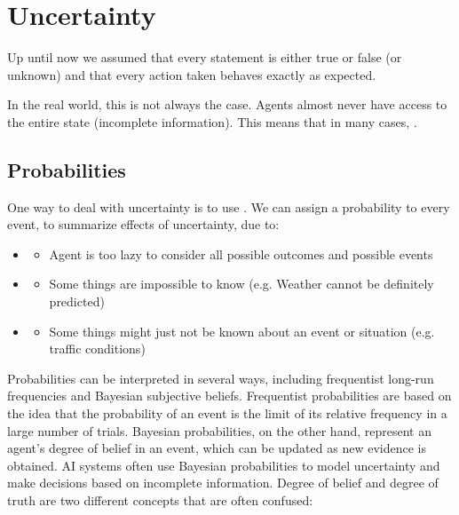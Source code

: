\documentclass[
../EiKI_Summary.tex,
]
{subfiles}
\begin{document}
\section{Uncertainty}
Up until now we assumed that every statement is either true or false (or unknown) and that every action taken behaves exactly as expected.

In the real world, this is not always the case. Agents almost never have access to the entire state (incomplete information). This means that in many cases, .

\subsection{Probabilities}
One way to deal with uncertainty is to use . We can assign a probability to every event, to summarize effects of uncertainty, due to:
\begin{itemize}
    \item {}
    \begin{itemize}
        \item Agent is too lazy to consider all possible outcomes and possible events
    \end{itemize}
    \item {}
    \begin{itemize}
        \item Some things are impossible to know (e.g. Weather cannot be definitely predicted)
    \end{itemize}
    \item {}
    \begin{itemize}
        \item Some things might just not be known about an event or situation (e.g. traffic conditions)
    \end{itemize}
\end{itemize}

Probabilities can be interpreted in several ways, including frequentist long-run frequencies and Bayesian subjective beliefs. 
Frequentist probabilities are based on the idea that the probability of an event is the limit of its relative frequency in a large number of trials. Bayesian probabilities, on the other hand, represent an agent's degree of belief in an event, which can be updated as new evidence is obtained. AI systems often use Bayesian probabilities to model uncertainty and make decisions based on incomplete information. Degree of belief and degree of truth are two different concepts that are often confused:
\end{document}
